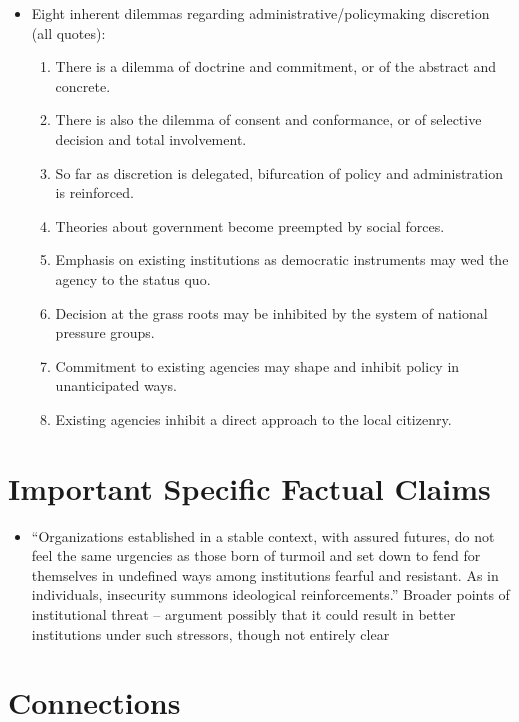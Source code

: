 \documentclass[12pt]{article}
\begin{document}
\begin{itemize}[leftmargin=*, itemsep=4pt]
    \item Eight inherent dilemmas regarding administrative/policymaking discretion (all quotes):
    \begin{enumerate}
        \item There is a dilemma of doctrine and commitment, or of the abstract and concrete.
        \item There is also the dilemma of consent and conformance, or of selective decision and total involvement.
        \item So far as discretion is delegated, bifurcation of policy and administration is reinforced.
        \item Theories about government become preempted by social forces.
        \item Emphasis on existing institutions as democratic instruments may wed the agency to the status quo.
        \item Decision at the grass roots may be inhibited by the system of national pressure groups.
        \item Commitment to existing agencies may shape and inhibit policy in unanticipated ways.
        \item Existing agencies inhibit a direct approach to the local citizenry.
    \end{enumerate} 
\end{itemize}


\section{Important Specific Factual Claims}

\begin{itemize}[leftmargin=*, itemsep=4pt]
    \item ``Organizations established in a stable context, with assured futures, do not feel the same urgencies as those born of turmoil and set down to fend for themselves in undefined ways among institutions fearful and resistant. As in individuals, insecurity summons ideological reinforcements.'' Broader points of institutional threat -- argument possibly that it could result in better institutions under such stressors, though not entirely clear
\end{itemize}


\section{Connections}
\end{document}
